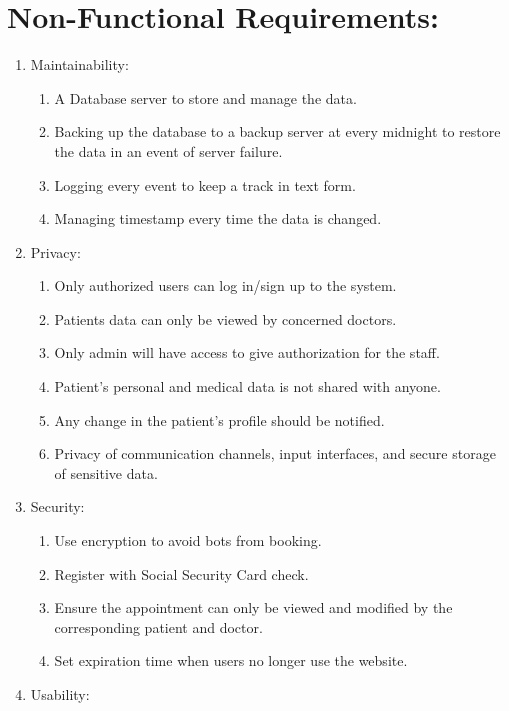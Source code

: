 \documentclass[a4paper,12pt]{report}
\begin{document}
\section*{Non-Functional Requirements:} 
\begin{enumerate}
    \item Maintainability:
        \begin{enumerate}
            \item A Database server to store and manage the data.
            \item Backing up the database to a backup server at every midnight to restore the data in an event of server failure.
            \item Logging every event to keep a track in text form.
            \item Managing timestamp every time the data is changed.
    \end{enumerate}
    \item Privacy:
        \begin{enumerate}
            \item Only authorized users can log in/sign up to the system.
            \item Patients data can only be viewed by concerned doctors.
            \item Only admin will have access to give authorization for the staff.
            \item Patient's personal and medical data is not shared with anyone.
            \item Any change in the patient's profile should be notified.
            \item Privacy of communication channels, input interfaces, and secure storage of sensitive data.
        \end{enumerate}
    \item Security:
        \begin{enumerate}
            \item Use encryption to avoid bots from booking.
            \item Register with Social Security Card check.
            \item Ensure the appointment can only be viewed and modified by the corresponding patient and doctor.
            \item Set expiration time when users no longer use the website.
        \end{enumerate}
    \item Usability:
        \begin{enumerate}

\end{enumerate}
\end{enumerate}
\end{document}
